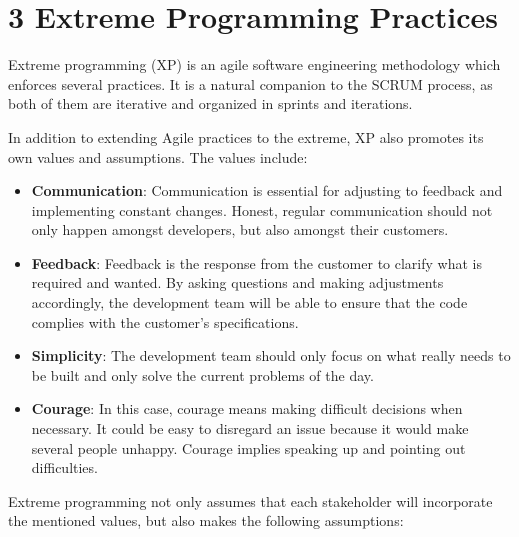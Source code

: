 \documentclass[]{article}
\begin{document}
\section{3 Extreme Programming
Practices}\label{extreme-programming-practices}

Extreme programming (XP) is an agile software engineering methodology
which enforces several practices. It is a natural companion to the SCRUM
process, as both of them are iterative and organized in sprints and
iterations.

In addition to extending Agile practices to the extreme, XP also
promotes its own values and assumptions. The values include:

\begin{itemize}
\itemsep1pt\parskip0pt
\item
  \textbf{Communication}: Communication is essential for adjusting to
  feedback and implementing constant changes. Honest, regular
  communication should not only happen amongst developers, but also
  amongst their customers.
\item
  \textbf{Feedback}: Feedback is the response from the customer to
  clarify what is required and wanted. By asking questions and making
  adjustments accordingly, the development team will be able to ensure
  that the code complies with the customer's specifications.
\item
  \textbf{Simplicity}: The development team should only focus on what
  really needs to be built and only solve the current problems of the
  day.
\item
  \textbf{Courage}: In this case, courage means making difficult
  decisions when necessary. It could be easy to disregard an issue
  because it would make several people unhappy. Courage implies speaking
  up and pointing out difficulties.
\end{itemize}

Extreme programming not only assumes that each stakeholder will
incorporate the mentioned values, but also makes the following
assumptions:
\end{document}
